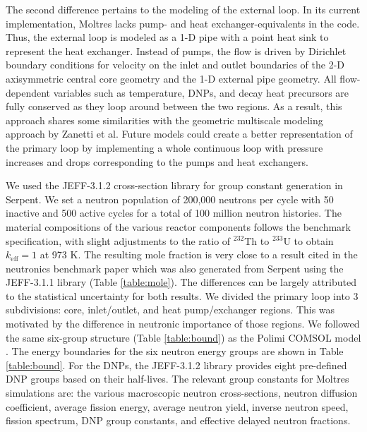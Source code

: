 The second difference pertains to the modeling of the external loop. In its
current implementation, Moltres lacks pump- and heat exchanger-equivalents in
the code. Thus, the external loop is modeled as a 1-D pipe with a point heat
sink to represent the heat exchanger. Instead of pumps, the flow is driven by
Dirichlet boundary conditions for velocity on the inlet and outlet boundaries
of the 2-D axisymmetric central core geometry and the 1-D external pipe
geometry. All flow-dependent variables such as temperature, \glspl{DNP}, and
decay heat precursors are fully conserved as they loop around between the two
regions. As a result, this approach shares some similarities with the
geometric multiscale modeling approach by Zanetti et al.
\cite{zanetti_geometric_2015} Future models could
create a better representation of the primary loop by implementing a whole
continuous loop with pressure increases and drops corresponding to the pumps
and heat exchangers. 

We used the JEFF-3.1.2 cross-section library \cite{oecd/nea_jeff-3.1.2_2014}
for group constant generation in
Serpent. We set a neutron population of 200,000 neutrons per cycle with 50
inactive and 500 active cycles for a total of 100 million neutron histories.
The material compositions of the various reactor components follows the
benchmark specification, with slight adjustments to the
ratio of $^{232}$Th to $^{233}$U to obtain $k_{\text{eff}}=1$ at 973 K. The
resulting mole fraction is very close to a result cited in the neutronics
benchmark paper which was also generated from Serpent using the JEFF-3.1.1
library (Table \ref{table:mole}). The differences can be largely attributed to
the statistical uncertainty for both results. We divided the primary loop into
3 subdivisions: core, inlet/outlet, and heat pump/exchanger regions. This was
motivated by the difference in neutronic importance of those regions. We
followed the same six-group
structure (Table \ref{table:bound}) as the Polimi COMSOL model
\cite{fiorina_modelling_2014}. The
energy boundaries for the six neutron energy groups are shown in Table
\ref{table:bound}. For the \glspl{DNP}, the JEFF-3.1.2 library provides
eight pre-defined \gls{DNP} groups based on their half-lives. The relevant
group constants for Moltres simulations are: the various macroscopic neutron
cross-sections, neutron diffusion coefficient, average fission energy, average
neutron yield, inverse neutron speed, fission spectrum, \gls{DNP} group
constants, and effective delayed neutron fractions.

